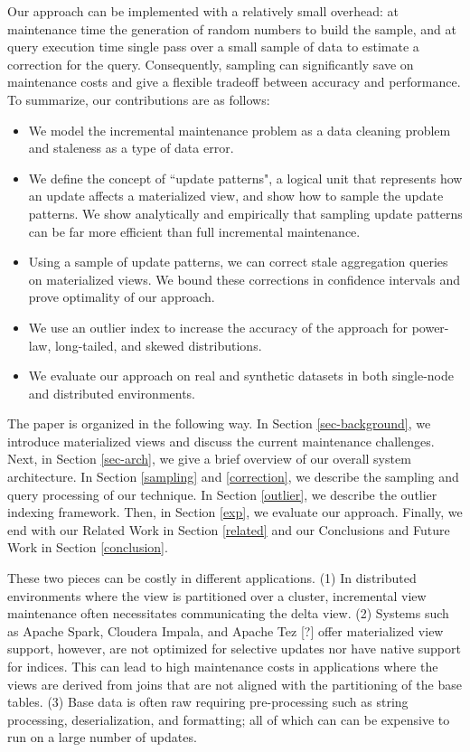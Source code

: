 Our approach can be implemented with a relatively small overhead: at maintenance time the generation of random numbers to build the sample, and at query execution time single pass over a small sample of data to estimate a correction for the query.
Consequently, sampling can significantly save on maintenance costs and give a flexible tradeoff between accuracy and performance.
To summarize, our contributions are as follows:
\begin{itemize}
  \item We model the incremental maintenance problem as a data cleaning problem and staleness as a type of data error.\vspace{-0.25em}
  \item We define the concept of ``update patterns", a logical unit that represents how an update affects a materialized view, and show how to sample the update patterns. We show analytically and empirically that sampling update patterns can be far more efficient than full incremental maintenance.\vspace{-0.25em}
  \item Using a sample of update patterns, we can correct stale aggregation queries on materialized views. We bound these corrections in confidence intervals and prove optimality of our approach.\vspace{-0.25em}
  \item We use an outlier index to increase the accuracy of the approach for power-law, long-tailed, and skewed distributions.\vspace{-0.25em}
  \item We evaluate our approach on real and synthetic datasets in both single-node and distributed environments.
\end{itemize}

The paper is organized in the following way. 
In Section \ref{sec-background}, we introduce materialized views and discuss the current maintenance challenges.
Next, in Section \ref{sec-arch}, we give a brief overview of our overall system architecture.
In Section \ref{sampling} and \ref{correction}, we describe the sampling and query processing of our technique.
In Section \ref{outlier}, we describe the outlier indexing framework.
Then, in Section \ref{exp}, we evaluate our approach.
Finally, we end with our Related Work in Section \ref{related} and our Conclusions and Future Work in Section \ref{conclusion}.

\iffalse
 These two pieces can be costly in different
applications. (1) In distributed environments where the view is partitioned
over a cluster, incremental view maintenance often necessitates communicating
the delta view. (2) Systems such as Apache Spark, Cloudera Impala,
and Apache Tez {[}?{]} offer materialized view support, however, are
not optimized for selective updates nor have native support for indices.
This can lead to high maintenance costs in applications where the
views are derived from joins that are not aligned with the partitioning
of the base tables. (3) Base data is often raw requiring pre-processing
such as string processing, deserialization, and formatting; all of
which can can be expensive to run on a large number of updates. 




